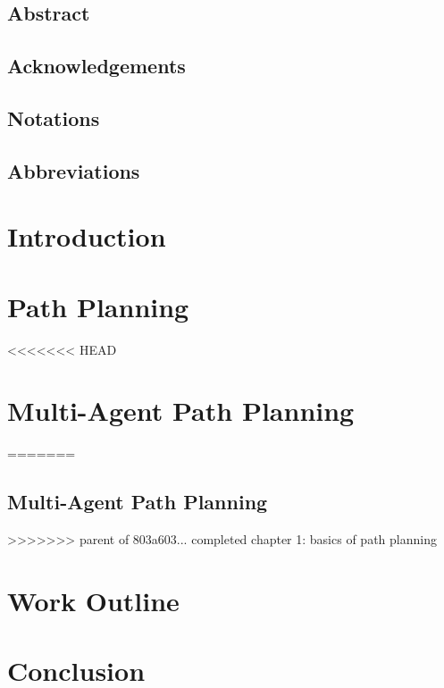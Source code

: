 \documentclass{thesisreport}
\begin{document}
  
 
\section*{Abstract}
 
\section*{Acknowledgements}
 

\section*{Notations}
 

\section*{Abbreviations}
 
 
\listoffigures

\listoftables

\tableofcontents


\chapter*{Introduction}
 

\chapter{Path Planning}
 
<<<<<<< HEAD
\chapter{Multi-Agent Path Planning}
=======
\section{Multi-Agent Path Planning} 
>>>>>>> parent of 803a603... completed chapter 1: basics of path planning
 
\chapter{Work Outline}
 
\chapter*{Conclusion}
 
  
\newpage


 

 
 
 
 
\end{document}
